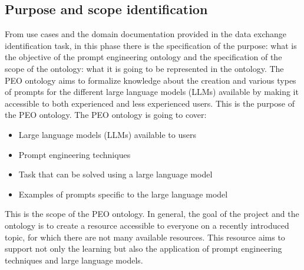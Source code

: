 \subsection{Purpose and scope identification}
From use cases and the domain documentation provided in the data exchange identification task, in this phase there is the specification of the purpose: what is the objective of the prompt engineering ontology and the specification of the scope of the ontology: what it is going to be represented in the ontology. The PEO ontology aims to formalize knowledge about the creation and various types of prompts for the different large language models (LLMs) available by making it accessible to both experienced and less experienced users. This is the purpose of the PEO ontology.
The PEO ontology is going to cover:
\begin{itemize}
    \item Large language models (LLMs) available to users
    \item Prompt engineering techniques
    \item Task that can be solved using a large language model
    \item Examples of prompts specific to the large language model
\end{itemize}
This is the scope of the PEO ontology.
In general, the goal of the project and the ontology is to create a resource accessible to everyone on a recently introduced topic, for which there are not many available resources. This resource aims to support not only the learning but also the application of prompt engineering techniques and large language models.

